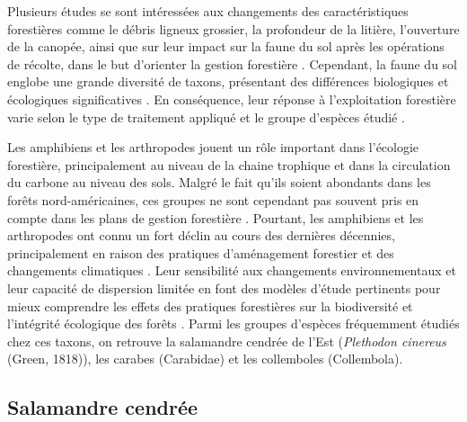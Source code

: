 Plusieurs études se sont intéressées aux changements des caractéristiques forestières comme le débris ligneux grossier, la profondeur de la litière, l'ouverture de la canopée, 
ainsi que sur leur impact sur la faune du sol après les opérations de récolte, dans le but d'orienter la gestion forestière \citep{Semlitsch2002CriticalElements,McKenny2006Effectsstructural}. 
Cependant, la faune du sol englobe une grande diversité de taxons, présentant des différences biologiques et écologiques significatives \citep{Kudrin2023metaanalysiseffects}. 
En conséquence, leur réponse à l'exploitation forestière varie selon le type de traitement appliqué et le groupe d'espèces étudié \citep{Malmstrom2009Dynamicssoil,Paillet2010Biodiversitydifferences}. 

Les amphibiens et les arthropodes jouent un rôle important dans l'écologie forestière, principalement au niveau de la chaine trophique et dans la circulation du carbone au niveau des sols. 
Malgré le fait qu'ils soient abondants dans les forêts nord-américaines, ces groupes ne sont cependant pas souvent pris en compte dans les plans de gestion forestière \citep{deMaynadier1995relationshipforest}. 
Pourtant, les amphibiens et les arthropodes ont connu un fort déclin au cours des dernières décennies, principalement en raison des pratiques d'aménagement forestier et des changements climatiques \citep{Houlahan2000Quantitativeevidence,Stuart2004Statustrends,Warren2018projectedeffect,Wagner2021Insectdecline}. 
Leur sensibilité aux changements environnementaux et leur capacité de dispersion limitée en font des modèles d'étude pertinents pour mieux comprendre les effets des pratiques forestières 
sur la biodiversité et l'intégrité écologique des forêts \citep{pongeVerticalDistributionCollembola2000,Ojala2001Dispersalmicroarthropods,birdChangesSoilLitter2004,Maleque2009Arthropodsbioindicators}. 
Parmi les groupes d'espèces fréquemment étudiés chez ces taxons, on retrouve la salamandre cendrée de l'Est (\textit{Plethodon cinereus} (Green, 1818)), les carabes (Carabidae) et les collemboles (Collembola). 

\subsection*{Salamandre cendrée}

